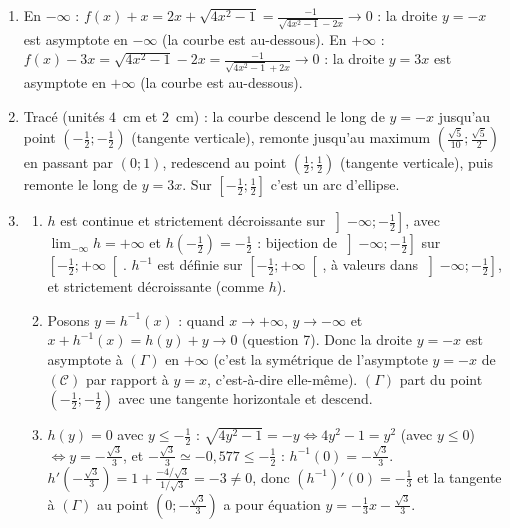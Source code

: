 \begin{corrige}
\begin{sol}
\begin{enumerate}
      \[
      \begin{array}{c|ccccccccc}
      x & -\infty & & -\frac{1}{2} & & \frac{\sqrt{5}}{10} & & \frac{1}{2} & & +\infty \\ \hline
      f'(x) & & - & \| & + & 0 & - & \| & + & \\ \hline
      f(x) & +\infty & \searrow & -\frac{1}{2} & \nearrow & \frac{\sqrt{5}}{2} & \searrow & \frac{1}{2} & \nearrow & +\infty
      \end{array}
      \]
\item En $-\infty$ : $f(x) + x = 2x + \sqrt{4x^2-1} = \frac{-1}{\sqrt{4x^2-1} - 2x} \to 0$ : la droite $y = -x$ est asymptote en $-\infty$
      (la courbe est au-dessous). En $+\infty$ : $f(x) - 3x = \sqrt{4x^2-1} - 2x = \frac{-1}{\sqrt{4x^2-1} + 2x} \to 0$ : la droite $y = 3x$ est asymptote
      en $+\infty$ (la courbe est au-dessous).
\item Trac\'e (unit\'es $4$~cm et $2$~cm) : la courbe descend le long de $y = -x$ jusqu'au point $\left(-\frac{1}{2};-\frac{1}{2}\right)$ (tangente verticale),
      remonte jusqu'au maximum $\left(\frac{\sqrt{5}}{10};\frac{\sqrt{5}}{2}\right)$ en passant par $(0;1)$, redescend au point $\left(\frac{1}{2};\frac{1}{2}\right)$
      (tangente verticale), puis remonte le long de $y = 3x$. Sur $\left[-\frac{1}{2};\frac{1}{2}\right]$ c'est un arc d'ellipse.
\item \begin{enumerate}
      \item $h$ est continue et strictement d\'ecroissante sur $\left]-\infty;-\frac{1}{2}\right]$, avec $\lim_{-\infty} h = +\infty$ et $h\left(-\frac{1}{2}\right) = -\frac{1}{2}$ :
            bijection de $\left]-\infty;-\frac{1}{2}\right]$ sur $\left[-\frac{1}{2};+\infty\right[$. $h^{-1}$ est d\'efinie sur $\left[-\frac{1}{2};+\infty\right[$,
            \`a valeurs dans $\left]-\infty;-\frac{1}{2}\right]$, et strictement d\'ecroissante (comme $h$).
      \item Posons $y = h^{-1}(x)$ : quand $x \to +\infty$, $y \to -\infty$ et $x + h^{-1}(x) = h(y) + y \to 0$ (question 7).
            Donc la droite $y = -x$ est asymptote \`a $(\Gamma)$ en $+\infty$ (c'est la sym\'etrique de l'asymptote $y = -x$ de $(\mathcal{C})$ par rapport \`a $y = x$,
            c'est-\`a-dire elle-m\^eme). $(\Gamma)$ part du point $\left(-\frac{1}{2};-\frac{1}{2}\right)$ avec une tangente horizontale et descend.
      \item $h(y) = 0$ avec $y \leq -\frac{1}{2}$ : $\sqrt{4y^2 - 1} = -y \iff 4y^2 - 1 = y^2$ (avec $y \leq 0$) $\iff y = -\frac{\sqrt{3}}{3}$, et
            $-\frac{\sqrt{3}}{3} \simeq -0{,}577 \leq -\frac{1}{2}$ : $\boxed{h^{-1}(0) = -\frac{\sqrt{3}}{3}}$.
            $h'\left(-\frac{\sqrt{3}}{3}\right) = 1 + \frac{-4/\sqrt{3}}{1/\sqrt{3}} = -3 \neq 0$, donc $\left(h^{-1}\right)'(0) = -\frac{1}{3}$ et la tangente \`a $(\Gamma)$ au point
            $\left(0 ; -\frac{\sqrt{3}}{3}\right)$ a pour \'equation $\boxed{y = -\frac{1}{3}x - \frac{\sqrt{3}}{3}}$.
      \end{enumerate}
\end{enumerate}
\end{sol}
\end{corrige}
